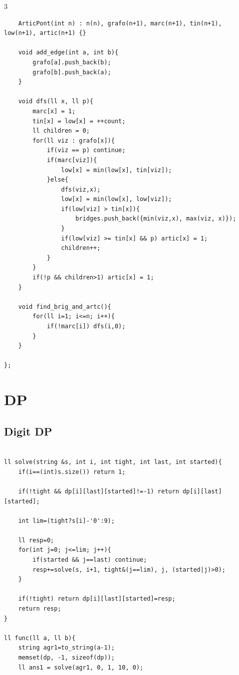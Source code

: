 \documentclass[9pt, a4paper, notitlepage]{extreport}
\begin{document}
\begin{multicols}{3}
\begin{verbatim}
    ArticPont(int n) : n(n), grafo(n+1), marc(n+1), tin(n+1), low(n+1), artic(n+1) {}

    void add_edge(int a, int b){
        grafo[a].push_back(b);
        grafo[b].push_back(a);
    }

    void dfs(ll x, ll p){
        marc[x] = 1;
        tin[x] = low[x] = ++count;
        ll children = 0;
        for(ll viz : grafo[x]){
            if(viz == p) continue;
            if(marc[viz]){
                low[x] = min(low[x], tin[viz]);
            }else{
                dfs(viz,x);
                low[x] = min(low[x], low[viz]);
                if(low[viz] > tin[x]){
                    bridges.push_back({min(viz,x), max(viz, x)});
                }
                if(low[viz] >= tin[x] && p) artic[x] = 1;
                children++;
            }
        }
        if(!p && children>1) artic[x] = 1;
    }

    void find_brig_and_artc(){
        for(ll i=1; i<=n; i++){
            if(!marc[i]) dfs(i,0);
        }   
    }

};
\end{verbatim}



%
%

\section{DP}

\subsection{Digit DP}
\begin{verbatim}

ll solve(string &s, int i, int tight, int last, int started){ 
    if(i==(int)s.size()) return 1;

    if(!tight && dp[i][last][started]!=-1) return dp[i][last][started];

    int lim=(tight?s[i]-'0':9);

    ll resp=0;
    for(int j=0; j<=lim; j++){
        if(started && j==last) continue;
        resp+=solve(s, i+1, tight&(j==lim), j, (started|j)>0);
    }

    if(!tight) return dp[i][last][started]=resp;
    return resp;
}

ll func(ll a, ll b){
    string agr1=to_string(a-1);
    memset(dp, -1, sizeof(dp));
    ll ans1 = solve(agr1, 0, 1, 10, 0);


\end{verbatim}
\end{multicols}
\end{document}
